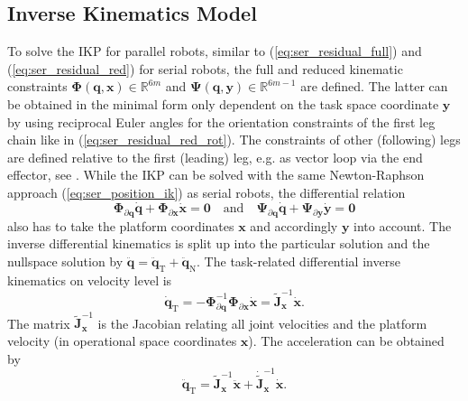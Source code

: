\documentclass[a4paper,twoside]{article}
\begin{document}
\subsection{Inverse Kinematics Model}
\label{sec:ikp_parrob}


To solve the IKP for parallel robots, similar to (\ref{eq:ser_residual_full}) and (\ref{eq:ser_residual_red}) for serial robots, the full and reduced kinematic constraints $\bm{\Phi}(\bm{q},\bm{x}){\in}\mathbb{R}^{6m}$ and $\bm{\Psi}(\bm{q},\bm{y}){\in}\mathbb{R}^{6m-1}$ are defined.
The latter can be obtained in the minimal form only dependent on the task space coordinate $\bm{y}$ by using reciprocal Euler angles for the orientation constraints of the first leg chain like in (\ref{eq:ser_residual_red_rot}).
The constraints of other (following) legs are defined relative to the first (leading) leg, e.g. as vector loop via the end effector, see \cite{SchapplerTapOrt2019}.
While the IKP can be solved with the same Newton-Raphson approach (\ref{eq:ser_position_ik}) as serial robots, the
differential relation 
\begin{equation}
\bm{\Phi}_{\partial \bm{q}} \dot{\bm{q}} + \bm{\Phi}_{\partial \bm{x}} \dot{\bm{x}} = \bm{0}
\quad \mathrm{and} \quad
\bm{\Psi}_{\partial \bm{q}} \dot{\bm{q}} + \bm{\Psi}_{\partial \bm{y}} \dot{\bm{y}} = \bm{0}
\label{equ:par_differential_constraints}
\end{equation}
also has to take the platform coordinates $\bm{x}$ and accordingly $\bm{y}$ into account.
The inverse differential kinematics is split up into the particular solution and the nullspace solution by $\ddot{\bm{q}}=\ddot{\bm{q}}_{\mathrm{T}}+\ddot{\bm{q}}_{\mathrm{N}}$.
The task-related differential inverse kinematics on velocity level is
\begin{equation}
\dot{\bm{q}}_{\mathrm{T}}=-\bm{\Phi}_{\partial \bm{q}}^{-1} \bm{\Phi}_{\partial \bm{x}}\dot{\bm{x}} = \tilde{\bm{J}}_{\bm{x}}^{-1}\dot{\bm{x}}.
\label{equ:parrob_def_jinv_full}
\end{equation}
The matrix $\tilde{\bm{J}}_{\bm{x}}^{-1}$ is the Jacobian relating all joint velocities and the platform velocity (in operational space coordinates $\bm{x}$).
The acceleration can be obtained by
\begin{equation}
\ddot{\bm{q}}_{\mathrm{T}}=\tilde{\bm{J}}_{\bm{x}}^{-1}\ddot{\bm{x}}+\dot{\tilde{\bm{J}}}_{\bm{x}}^{-1}\dot{\bm{x}}.
\label{eq:par_ik_acc_opspace}
\end{equation}
\end{document}
